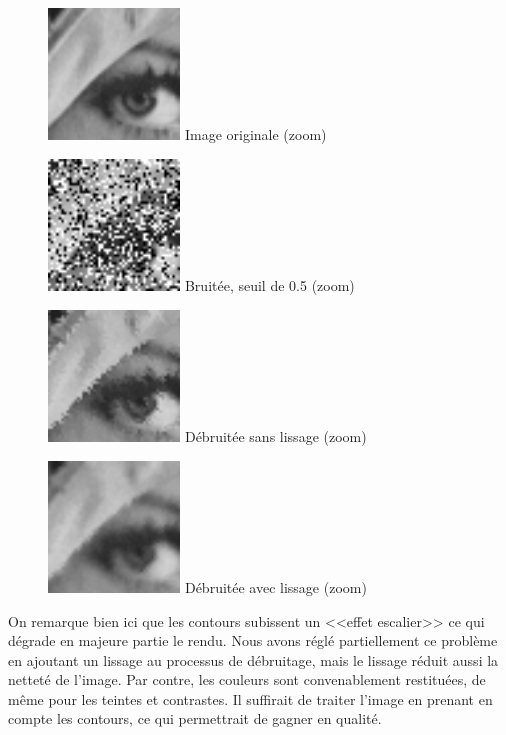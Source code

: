 \documentclass{article}
\begin{document}
		\begin{figure}[!ht]
			\centering
			\begin{minipage}[t]{3.5cm}
				\centering
				\includegraphics[width=3.5cm,height=3.5cm]{lenaZOOM.jpg}
				Image originale (zoom)
			\end{minipage}
			\begin{minipage}[t]{3.5cm}
				\centering
				\includegraphics[width=3.5cm,height=3.5cm]{SaltAndPepper/noisy_50_ZOOM.jpg}
				Bruitée, seuil de 0.5 (zoom)
			\end{minipage}
			\begin{minipage}[t]{3.5cm}
				\centering
				\includegraphics[width=3.5cm,height=3.5cm]{SaltAndPepper/algo1_50_ZOOM.jpg}
				Débruitée sans lissage (zoom)
			\end{minipage}
			\begin{minipage}[t]{3.5cm}
				\centering
				\includegraphics[width=3.5cm,height=3.5cm]{SaltAndPepper/algo2_50_ZOOM.jpg}
				Débruitée avec lissage (zoom)
			\end{minipage}
		\end{figure}
		On remarque bien ici que les contours subissent un <<effet escalier>> ce qui dégrade en majeure partie le rendu. Nous avons réglé partiellement ce problème en ajoutant un lissage au processus de débruitage, mais le lissage réduit aussi la netteté de l'image. Par contre, les couleurs sont convenablement restituées, de même pour les teintes et contrastes. Il suffirait de traiter l'image en prenant en compte les contours, ce qui permettrait de gagner en qualité.
		
\end{document}
